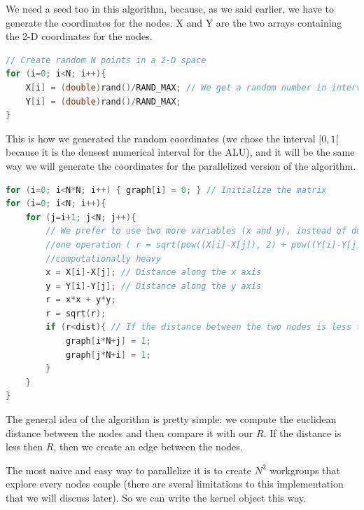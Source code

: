 \documentclass[titlepage]{article}
\begin{document}
We need a seed too in this algorithm, because, as we said earlier, we have to generate the coordinates for the nodes. X and Y are the two arrays containing the 2-D coordinates for the nodes.

\begin{minipage}{\linewidth}
\begin{lstlisting}[language=C, style=customc, breaklines=true]
// Create random N points in a 2-D space
for (i=0; i<N; i++){
    X[i] = (double)rand()/RAND_MAX; // We get a random number in interval [0,1[
    Y[i] = (double)rand()/RAND_MAX;
}
\end{lstlisting}
\end{minipage}

This is how we generated the random coordinates (we chose the interval $[0,1[$ because it is the densest numerical interval for the ALU), and it will be the same way we will generate the coordinates for the parallelized version of the algorithm.

\begin{minipage}{\linewidth}
\begin{lstlisting}[language=C, style=customc, breaklines=true]
for (i=0; i<N*N; i++) { graph[i] = 0; } // Initialize the matrix
for (i=0; i<N; i++){
    for (j=i+1; j<N; j++){
        // We prefer to use two more variables (x and y), instead of doing just
        //one operation ( r = sqrt(pow((X[i]-X[j]), 2) + pow((Y[i]-Y[j]), 2)) ) because this is less
        //computationally heavy
        x = X[i]-X[j]; // Distance along the x axis
        y = Y[i]-Y[j]; // Distance along the y axis
        r = x*x + y*y;
        r = sqrt(r);
        if (r<dist){ // If the distance between the two nodes is less than R then we will connect them
            graph[i*N+j] = 1;
            graph[j*N+i] = 1;
        }
    }
}
\end{lstlisting}
\end{minipage}

The general idea of the algorithm is pretty simple: we compute the euclidean distance between the nodes and then compare it with our $R$. If the distance is less then $R$, then we create an edge between the nodes.

The most naive and easy way to parallelize it is to create $N^2$ workgroups that explore every nodes couple (there are sveral limitations to this implementation that we will discuss later).
So we can write the kernel object this way.
\end{document}
